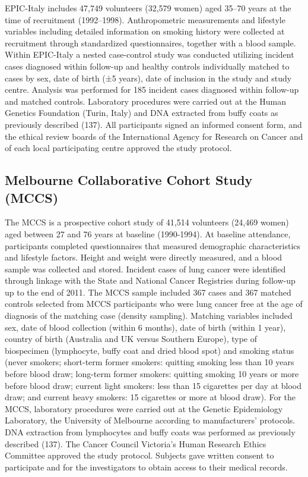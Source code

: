 \documentclass[11pt,twoside]{bristolthesis}
\begin{document}
EPIC-Italy includes 47,749 volunteers (32,579 women) aged 35--70 years at the time of recruitment (1992--1998). Anthropometric measurements and lifestyle variables including detailed information on smoking history were collected at recruitment through standardized questionnaires, together with a blood sample. Within EPIC-Italy a nested case-control study was conducted utilizing incident cases diagnosed within follow-up and healthy controls individually matched to cases by sex, date of birth (±5 years), date of inclusion in the study and study centre. Analysis was performed for 185 incident cases diagnosed within follow-up and matched controls. Laboratory procedures were carried out at the Human Genetics Foundation (Turin, Italy) and DNA extracted from buffy coats as previously described (137). All participants signed an informed consent form, and the ethical review boards of the International Agency for Research on Cancer and of each local participating centre approved the study protocol.

\hypertarget{mccs}{%
\subsection{Melbourne Collaborative Cohort Study (MCCS)}\label{mccs}}

The MCCS is a prospective cohort study of 41,514 volunteers (24,469 women) aged between 27 and 76 years at baseline (1990-1994). At baseline attendance, participants completed questionnaires that measured demographic characteristics and lifestyle factors. Height and weight were directly measured, and a blood sample was collected and stored. Incident cases of lung cancer were identified through linkage with the State and National Cancer Registries during follow-up up to the end of 2011. The MCCS sample included 367 cases and 367 matched controls selected from MCCS participants who were lung cancer free at the age of diagnosis of the matching case (density sampling). Matching variables included sex, date of blood collection (within 6 months), date of birth (within 1 year), country of birth (Australia and UK versus Southern Europe), type of biospecimen (lymphocyte, buffy coat and dried blood spot) and smoking status (never smokers; short-term former smokers: quitting smoking less than 10 years before blood draw; long-term former smokers: quitting smoking 10 years or more before blood draw; current light smokers: less than 15 cigarettes per day at blood draw; and current heavy smokers: 15 cigarettes or more at blood draw). For the MCCS, laboratory procedures were carried out at the Genetic Epidemiology Laboratory, the University of Melbourne according to manufacturers' protocols. DNA extraction from lymphocytes and buffy coats was performed as previously described (137). The Cancer Council Victoria's Human Research Ethics Committee approved the study protocol. Subjects gave written consent to participate and for the investigators to obtain access to their medical records.
\end{document}
